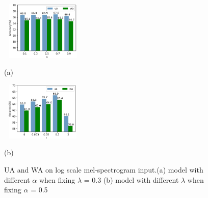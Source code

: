 \documentclass{article}
\begin{document}
\begin{figure}[htb]	
	\begin{minipage}[b]{0.48\linewidth}
		\label{fig:metric_lambda_alpha_a}
		\centering
		\centerline{\includegraphics[width=4cm, height=2.8cm]{fig4_alpha.png}}
		\centerline{(a)}\medskip
		
	\end{minipage}
	\hfill
	\begin{minipage}[b]{.48\linewidth}
		\centering
		\centerline{\includegraphics[width=4cm,height=2.8cm]{fig4_lambda.png}}
		\centerline{(b)  }\medskip
		\label{fig:metric_lambda_alpha_b}
	\end{minipage}
	\caption{UA and WA on log scale mel-spectrogram input.(a) model with different $\alpha$ when fixing $\lambda$ = 0.3 (b) model with different $\lambda$ when fixing $\alpha$ = 0.5}
	\label{fig:metric_lambda_alpha}
\end{figure}
\end{document}
